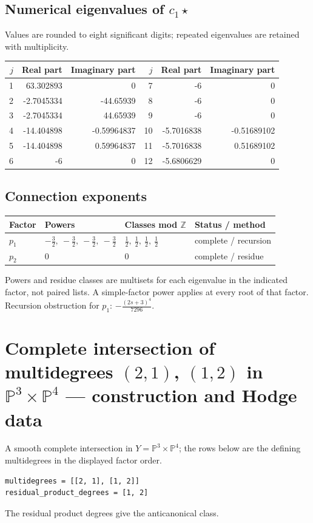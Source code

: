 \documentclass[10pt,a4paper]{article}
\begin{document}
\subsection*{Numerical eigenvalues of $c_1\star$}
Values are rounded to eight significant digits; repeated eigenvalues are retained with multiplicity.
\begin{center}\small\begin{tabular}{rrr@{\qquad}rrr}\toprule $j$ & Real part & Imaginary part & $j$ & Real part & Imaginary part\\\midrule
1 & 63.302893 & 0 & 7 & -6 & 0\\
2 & -2.7045334 & -44.65939 & 8 & -6 & 0\\
3 & -2.7045334 & 44.65939 & 9 & -6 & 0\\
4 & -14.404898 & -0.59964837 & 10 & -5.7016838 & -0.51689102\\
5 & -14.404898 & 0.59964837 & 11 & -5.7016838 & 0.51689102\\
6 & -6 & 0 & 12 & -5.6806629 & 0\\
\bottomrule\end{tabular}\end{center}
\subsection*{Connection exponents}
\begin{center}\begin{tabular}{llll}\toprule Factor & Powers & Classes mod $\mathbb Z$ & Status / method\\\midrule
$p_{1}$ & $- \frac{3}{2},\ - \frac{3}{2},\ - \frac{3}{2},\ - \frac{3}{2}$ & $\frac{1}{2},\ \frac{1}{2},\ \frac{1}{2},\ \frac{1}{2}$ & complete / recursion\\
$p_{2}$ & $0$ & $0$ & complete / residue\\
\bottomrule\end{tabular}\end{center}
Powers and residue classes are multisets for each eigenvalue in the indicated factor, not paired lists. A simple-factor power applies at every root of that factor.
Recursion obstruction for $p_{1}$: $- \frac{\left(2 s + 3\right)^{4}}{7296}$.
\clearpage\section*{Complete intersection of multidegrees $(2,1)$, $(1,2)$ in $\mathbb P^{3}\times \mathbb P^{4}$ --- construction and Hodge data}\label{entry:PROD5-D02}
A smooth complete intersection in $Y=\mathbb P^{3}\times\mathbb P^{4}$; the rows below are the defining multidegrees in the displayed factor order.
\begin{lstlisting}
multidegrees = [[2, 1], [1, 2]]
residual_product_degrees = [1, 2]
\end{lstlisting}
The residual product degrees give the anticanonical class.
\end{document}
